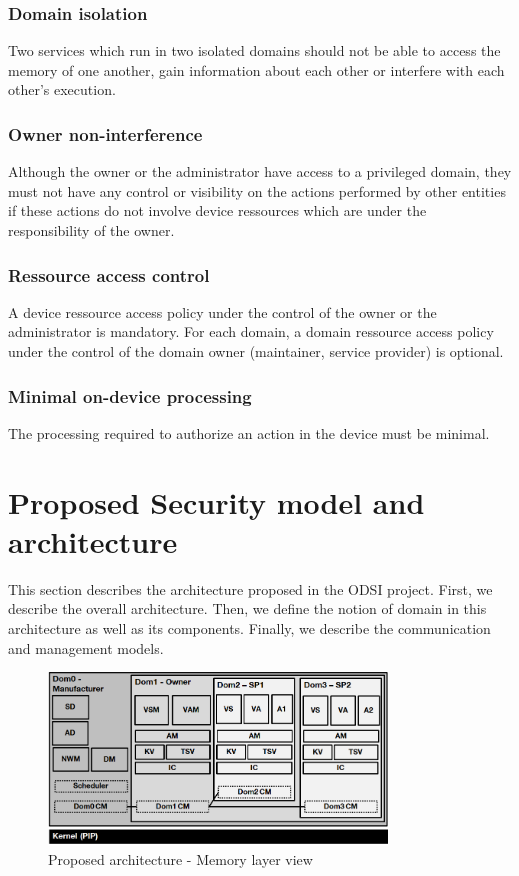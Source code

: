 \documentclass[conference]{IEEEtran}
\begin{document}
\subsubsection{Domain isolation}
Two services which run in two isolated domains should not be able to access the memory of one another, gain information about each other or interfere with each other's execution. 

\subsubsection{Owner non-interference}
Although the owner or the administrator have access to a privileged domain, they must not have any control or visibility on the actions performed by other entities if these actions do not involve device ressources which are under the responsibility of the owner.

\subsubsection{Ressource access control}
A device ressource access policy under the control of the owner or the administrator is mandatory. For each domain, a domain ressource access policy under the control of the domain owner (maintainer, service provider) is optional. 

\subsubsection{Minimal on-device processing}
The processing required to authorize an action in the device must be minimal. 

\section{Proposed Security model and architecture}
\label{sec:Architecture}
This section describes the architecture proposed in the ODSI project. First, we describe the overall architecture. Then, we define the notion of domain in this architecture as well as its components. Finally, we describe the communication and management models.


\begin{figure}[h!]
\centering
\includegraphics[width=9cm]{figures/mem_layout.png}
\caption{Proposed architecture - Memory layer view}
\label{fig:Arch_mem}
\end{figure}
\end{document}
